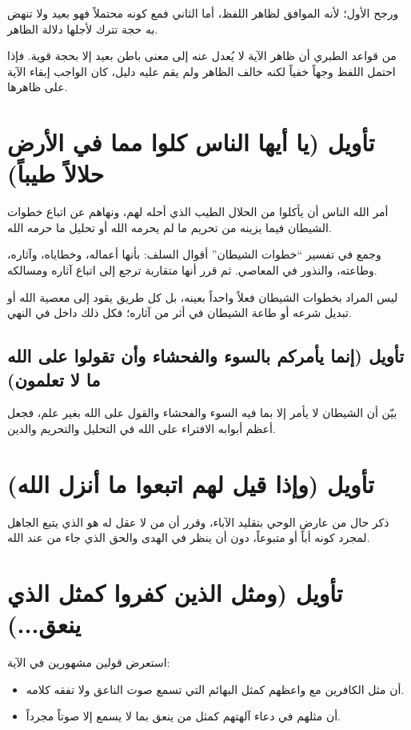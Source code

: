 ورجح الأول؛ لأنه الموافق لظاهر اللفظ، أما الثاني فمع كونه محتملاً فهو بعيد ولا تنهض به حجة تترك لأجلها دلالة الظاهر.

\begin{fawaid}
من قواعد الطبري أن ظاهر الآية لا يُعدل عنه إلى معنى باطن بعيد إلا بحجة قوية. فإذا احتمل اللفظ وجهاً خفياً لكنه خالف الظاهر ولم يقم عليه دليل، كان الواجب إبقاء الآية على ظاهرها.
\end{fawaid}

\separator

\section{تأويل (يا أيها الناس كلوا مما في الأرض حلالاً طيباً)}
أمر الله الناس أن يأكلوا من الحلال الطيب الذي أحله لهم، ونهاهم عن اتباع خطوات الشيطان فيما يزينه من تحريم ما لم يحرمه الله أو تحليل ما حرمه الله.

وجمع  في تفسير ``خطوات الشيطان'' أقوال السلف: بأنها أعماله، وخطاياه، وآثاره، وطاعته، والنذور في المعاصي. ثم قرر أنها متقاربة ترجع إلى اتباع آثاره ومسالكه.

\begin{fawaid}
ليس المراد بخطوات الشيطان فعلاً واحداً بعينه، بل كل طريق يقود إلى معصية الله أو تبديل شرعه أو طاعة الشيطان في أثر من آثاره؛ فكل ذلك داخل في النهي.
\end{fawaid}

\subsection{تأويل (إنما يأمركم بالسوء والفحشاء وأن تقولوا على الله ما لا تعلمون)}
بيّن  أن الشيطان لا يأمر إلا بما فيه السوء والفحشاء والقول على الله بغير علم، فجعل أعظم أبوابه الافتراء على الله في التحليل والتحريم والدين.

\separator

\section{تأويل (وإذا قيل لهم اتبعوا ما أنزل الله)}
ذكر  حال من عارض الوحي بتقليد الآباء، وقرر أن من لا عقل له هو الذي يتبع الجاهل لمجرد كونه أباً أو متبوعاً، دون أن ينظر في الهدى والحق الذي جاء من عند الله.

\separator

\section{تأويل (ومثل الذين كفروا كمثل الذي ينعق...)}
استعرض  قولين مشهورين في الآية:
\begin{itemize}
    \item أن مثل الكافرين مع واعظهم كمثل البهائم التي تسمع صوت الناعق ولا تفقه كلامه.
    \item أن مثلهم في دعاء آلهتهم كمثل من ينعق بما لا يسمع إلا صوتاً مجرداً.
\end{itemize}

